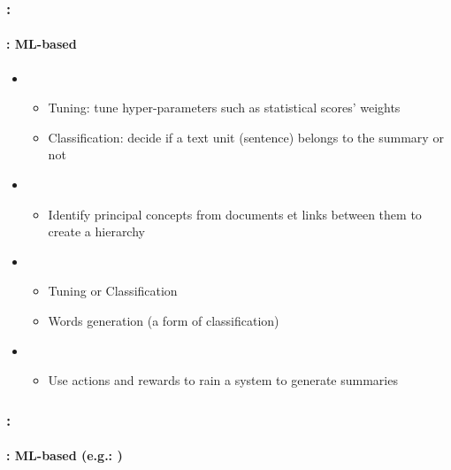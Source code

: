 \documentclass[xcolor=table]{beamer}
\begin{document}
\begin{frame}
	\frametitle{\insertshortsubtitle: \insertsection}
	\framesubtitle{\insertsubsection: ML-based}
	
	\begin{itemize}
		\item {}
		\begin{itemize}
			\item Tuning: tune hyper-parameters such as statistical scores' weights
			\item Classification: decide if a text unit (sentence) belongs to the summary or not
		\end{itemize}
		\item {}
		\begin{itemize}
			\item Identify principal concepts from documents et links between them to create a hierarchy
		\end{itemize}
		\item {}
		\begin{itemize}
			\item Tuning or Classification
			\item Words generation (a form of classification)
		\end{itemize}
		\item {}
		\begin{itemize}
			\item Use actions and rewards to rain a system to generate summaries
		\end{itemize}
	\end{itemize}
	
\end{frame}


\begin{frame}
	\frametitle{\insertshortsubtitle: \insertsection}
	\framesubtitle{\insertsubsection: ML-based (e.g.: \cite{2020-aries})}
	
	\begin{center}
	\end{center}
	
\end{frame}
\end{document}
